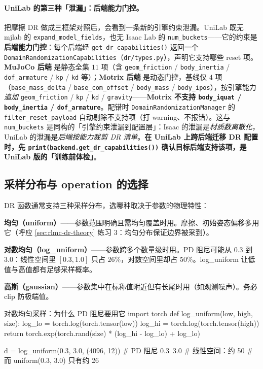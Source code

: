 \paragraph{UniLab 的第三种「泄漏」：后端能力门控。}把摩擦 DR 做成三框架对照后，会看到一条新的引擎约束泄漏。UniLab 既无 mjlab 的 \verb|expand_model_fields|，也无 Isaac Lab 的 \verb|num_buckets|——它的约束是\textbf{后端能力门控}：每个后端经 \verb|get_dr_capabilities()| 返回一个 \verb|DomainRandomizationCapabilities|（\verb|dr/types.py|），声明它支持哪些 reset 项。\textbf{MuJoCo 后端} 是静态全集 $11$ 项（含 \verb|geom_friction| / \verb|body_inertia| / \verb|dof_armature| / \verb|kp| / \verb|kd| 等）；\textbf{Motrix 后端} 是动态门控，基线仅 $4$ 项（\verb|base_mass_delta| / \verb|base_com_offset| / \verb|body_mass| / \verb|body_ipos|），按引擎能力\emph{追加} \verb|geom_friction| / \verb|kp| / \verb|kd| / \verb|gravity|——\textbf{Motrix 不支持 \texttt{body\_iquat} / \texttt{body\_inertia} / \texttt{dof\_armature}}。配错时 \verb|DomainRandomizationManager| 的 \verb|filter_reset_payload| 自动剔除不支持项（打 warning、不报错）。这与 \verb|num_buckets| 是同构的「引擎约束泄漏到配置层」：Isaac 的泄漏是\emph{材质数离散化}，UniLab 的泄漏是\emph{后端按能力裁剪 DR 清单}。\textbf{在 UniLab 上跨后端迁移 DR 配置时，先 \texttt{print(backend.get\_dr\_capabilities())} 确认目标后端支持该项，是 UniLab 版的「训练前体检」}。

\subsection{采样分布与 operation 的选择}
\label{sec:rlmc-dr-func-dist}

DR 函数通常支持三种采样分布，选哪种取决于参数的物理特性：

\textbf{均匀（uniform）}——参数范围明确且需均匀覆盖时用。摩擦、初始姿态偏移多用它（呼应 \cref{sec:rlmc-dr-theory} 练习 3：均匀分布保证边界被采到）。

\textbf{对数均匀（log\_uniform）}——参数跨多个数量级时用。PD 阻尼可能从 $0.3$ 到 $3.0$：线性空间里 $[0.3,1.0]$ 只占 $26\%$，对数空间里却占 $50\%$。log\_uniform 让低值与高值都有足够采样概率。

\textbf{高斯（gaussian）}——参数集中在标称值附近但有长尾时用（如观测噪声）。务必 clip 防极端值。

\begin{codebox}[Python]{对数均匀采样：为什么 PD 阻尼要用它}
import torch
def log_uniform(low, high, size):
    log_lo = torch.log(torch.tensor(low))
    log_hi = torch.log(torch.tensor(high))
    return torch.exp(torch.rand(size) * (log_hi - log_lo) + log_lo)

d = log_uniform(0.3, 3.0, (4096, 12))   # PD 阻尼 0.3~3.0
# 线性空间：约 50%
# 而 uniform(0.3, 3.0) 只有约 26%
\end{codebox}


